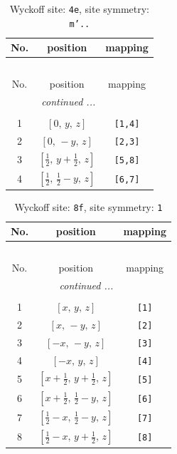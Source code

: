 \documentclass[fleqn,8pt]{jsarticle}
\begin{document}
\renewcommand{\arraystretch}{1.2}
\begin{longtable}{ccc}
\caption{Wyckoff site: {\tt 4e}, site symmetry: {\tt m'..}}
 \\
 \hline \hline
No. & position & mapping \\ \hline \endfirsthead

\multicolumn{2}{l}{\tablename\ \thetable{}} \\
 \hline \hline
No. & position & mapping \\ \hline \endhead

 \hline \hline
\multicolumn{2}{r}{\footnotesize\it continued ...} \\ \endfoot

 \hline \hline
\multicolumn{2}{r}{} \\ \endlastfoot

1 & $\left[ 0,\, y,\, z \right]$ & {\tt [1,4]} \\ \hline
2 & $\left[ 0,\, - y,\, z \right]$ & {\tt [2,3]} \\ \hline
3 & $\left[ \frac{1}{2},\, y + \frac{1}{2},\, z \right]$ & {\tt [5,8]} \\ \hline
4 & $\left[ \frac{1}{2},\, \frac{1}{2} - y,\, z \right]$ & {\tt [6,7]} \\
\end{longtable}
\renewcommand{\arraystretch}{1.2}
\begin{longtable}{ccc}
\caption{Wyckoff site: {\tt 8f}, site symmetry: {\tt 1}}
 \\
 \hline \hline
No. & position & mapping \\ \hline \endfirsthead

\multicolumn{2}{l}{\tablename\ \thetable{}} \\
 \hline \hline
No. & position & mapping \\ \hline \endhead

 \hline \hline
\multicolumn{2}{r}{\footnotesize\it continued ...} \\ \endfoot

 \hline \hline
\multicolumn{2}{r}{} \\ \endlastfoot

1 & $\left[ x,\, y,\, z \right]$ & {\tt [1]} \\ \hline
2 & $\left[ x,\, - y,\, z \right]$ & {\tt [2]} \\ \hline
3 & $\left[ - x,\, - y,\, z \right]$ & {\tt [3]} \\ \hline
4 & $\left[ - x,\, y,\, z \right]$ & {\tt [4]} \\ \hline
5 & $\left[ x + \frac{1}{2},\, y + \frac{1}{2},\, z \right]$ & {\tt [5]} \\ \hline
6 & $\left[ x + \frac{1}{2},\, \frac{1}{2} - y,\, z \right]$ & {\tt [6]} \\ \hline
7 & $\left[ \frac{1}{2} - x,\, \frac{1}{2} - y,\, z \right]$ & {\tt [7]} \\ \hline
8 & $\left[ \frac{1}{2} - x,\, y + \frac{1}{2},\, z \right]$ & {\tt [8]} \\
\end{longtable}
\end{document}
